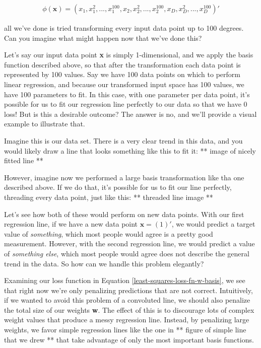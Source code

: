 \begin{align*}
    \phi(\textbf{x}) = (x_{1}, x_{1}^{2}, ..., x_{1}^{100}, x_{2}, x_{2}^{2}, ..., x_{2}^{100}, x_{D}, x_{D}^{2}, ..., x_{D}^{100})'
\end{align*}

all we've done is tried transforming every input data point up to 100 degrees. Can you imagine what might happen now that we've done this?

Let's say our input data point \textbf{x} is simply 1-dimensional, and we apply the basis function described above, so that after the transformation each data point is represented by 100 values. Say we have 100 data points on which to perform linear regression, and because our transformed input space has 100 values, we have 100 parameters to fit. In this case, with one parameter per data point, it's possible for us to fit our regression line perfectly to our data so that we have 0 loss! But is this a desirable outcome? The answer is no, and we'll provide a visual example to illustrate that.

Imagine this is our data set. There is a very clear trend in this data, and you would likely draw a line that looks something like this to fit it:
** image of nicely fitted line **

However, imagine now we performed a large basis transformation like tha one described above. If we do that, it's possible for us to fit our line perfectly, threading every data point, just like this:
** threaded line image **

Let's see how both of these would perform on new data points. With our first regression line, if we have a new data point $\textbf{x} = (1)'$, we would predict a target value of \textit{something}, which most people would agree is a pretty good measurement. However, with the second regression line, we would predict a value of \textit{something else}, which most people would agree does not describe the general trend in the data. So how can we handle this problem elegantly?

Examining our loss function in Equation \ref{least-squares-loss-fn-w-basis}, we see that right now we're only penalizing predictions that are not correct. Intuitively, if we wanted to avoid this problem of a convoluted line, we should also penalize the total size of our weights \textbf{w}. The effect of this is to discourage lots of complex weight values that produce a messy regression line. Instead, by penalizing large weights, we favor simple regression lines like the one in ** figure of simple line that we drew ** that take advantage of only the most important basis functions.

